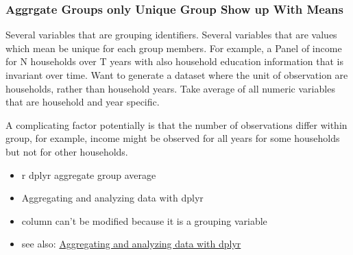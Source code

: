 \documentclass[
]{book}
\providecommand{\tightlist}{%
  \setlength{\itemsep}{0pt}\setlength{\parskip}{0pt}}
\begin{document}
\hypertarget{aggrgate-groups-only-unique-group-show-up-with-means}{%
\subsubsection{Aggrgate Groups only Unique Group Show up With Means}\label{aggrgate-groups-only-unique-group-show-up-with-means}}

Several variables that are grouping identifiers. Several variables that are values which mean be unique for each group members. For example, a Panel of income for N households over T years with also household education information that is invariant over time. Want to generate a dataset where the unit of observation are households, rather than household years. Take average of all numeric variables that are household and year specific.

A complicating factor potentially is that the number of observations differ within group, for example, income might be observed for all years for some households but not for other households.

\begin{itemize}
\tightlist
\item
  r dplyr aggregate group average
\item
  Aggregating and analyzing data with dplyr
\item
  column can't be modified because it is a grouping variable
\item
  see also: \href{https://datacarpentry.org/dc_zurich/R-ecology/04-dplyr.html}{Aggregating and analyzing data with dplyr}
\end{itemize}
\end{document}
